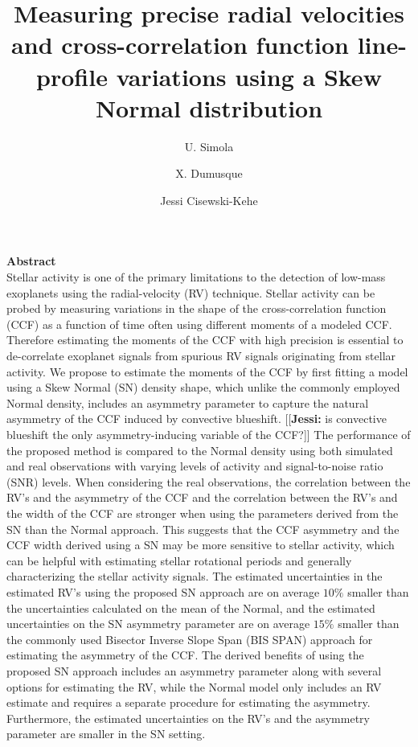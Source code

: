 \documentclass[11pt, oneside]{article}
\title{Measuring precise radial velocities and cross-correlation function line-profile variations using a Skew Normal distribution}
\author{U. Simola
	    \and X. Dumusque
	    \and Jessi Cisewski-Kehe
	    }
\newcommand{\jessi}[1]{{\color{Purple}[[\textbf{Jessi: }#1]]}}
\begin{document}
\maketitle

{\bf Abstract}\\
Stellar activity is one of the primary limitations to the detection of low-mass exoplanets using the radial-velocity (RV) technique. 
Stellar activity can be probed by measuring variations in the shape of the cross-correlation function (CCF) as a function of time often using different moments of a modeled CCF. Therefore estimating the moments of the CCF with high precision is essential to de-correlate exoplanet signals from spurious RV signals originating from stellar activity.
%
We propose to estimate the moments of the CCF by first fitting a model using a Skew Normal (SN) density shape, which unlike the commonly employed Normal density,  includes an asymmetry parameter to capture the natural asymmetry of the CCF induced by convective blueshift. \jessi{is convective blueshift the only asymmetry-inducing variable of the CCF?}
%
The performance of the proposed method is compared to the Normal density using both simulated and real observations with varying levels of activity and signal-to-noise ratio (SNR) levels.
%
When considering the real observations, the correlation between the RV's and the asymmetry of the CCF and the correlation between the RV's and the width of the CCF are stronger when using the parameters derived from the SN than the Normal approach. 
This suggests that the CCF asymmetry and the CCF width derived using a SN may be more sensitive to stellar activity, which can be helpful with estimating stellar rotational periods and generally characterizing the stellar activity signals.
%
The estimated uncertainties in the estimated RV's using the proposed SN approach are on average $10\%$ smaller than the uncertainties calculated on the mean of the Normal, and the estimated uncertainties on the SN asymmetry parameter are on average $15\%$ smaller than the commonly used Bisector Inverse Slope Span (BIS SPAN) approach for estimating the asymmetry of the CCF. 
%
The derived benefits of using the proposed SN approach includes an asymmetry parameter along with several options for estimating the RV, while the Normal model only includes an RV estimate and requires a separate procedure for estimating the asymmetry.  Furthermore, the estimated uncertainties on the RV's and the asymmetry parameter are smaller in the SN setting.
\end{document}
